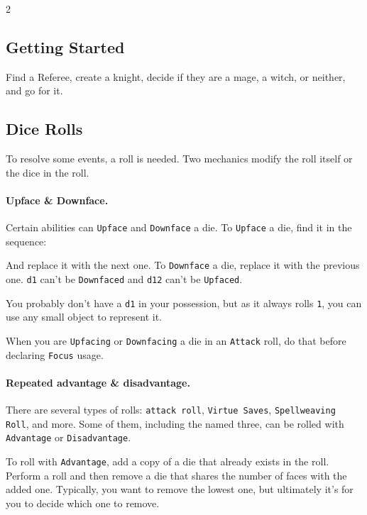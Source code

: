 \begin{multicols*}{2}

\subsection*{Getting Started}

Find a Referee, create a knight, decide if they are a mage, a witch, or neither, and go for it.

\subsection*{Dice Rolls}

To resolve some events, a roll is needed.
Two mechanics modify the roll itself or the dice in the roll.

\paragraph{Upface \& Downface.}

Certain abilities can \texttt{Upface} and \texttt{Downface} a die.
To \texttt{Upface} a die, find it in the sequence:

\colbox{
    \[\texttt{d1, d4, d6, d8, d12}\]
}

And replace it with the next one. To \texttt{Downface} a die, replace it with the previous one.
\texttt{d1} can't be \texttt{Downfaced} and \texttt{d12} can't be \texttt{Upfaced}.

You probably don't have a \texttt{d1} in your possession, but as it always rolls \texttt{1}, you can use any small object to represent it.

When you are \texttt{Upfacing} or \texttt{Downfacing} a die in an \texttt{Attack} roll, do that before declaring \texttt{Focus} usage.

\newcolumn
\paragraph{Repeated advantage \& disadvantage.}

There are several types of rolls: \texttt{attack roll}, \texttt{Virtue Saves}, \texttt{Spellweaving Roll}, and more.
Some of them, including the named three, can be rolled with \texttt{Advantage} or \texttt{Disadvantage}.

To roll with \texttt{Advantage}, add a copy of a die that already exists in the roll.
Perform a roll and then remove a die that shares the number of faces with the added one.
Typically, you want to remove the lowest one, but ultimately it's for you to decide which one to remove.


\end{multicols*}
